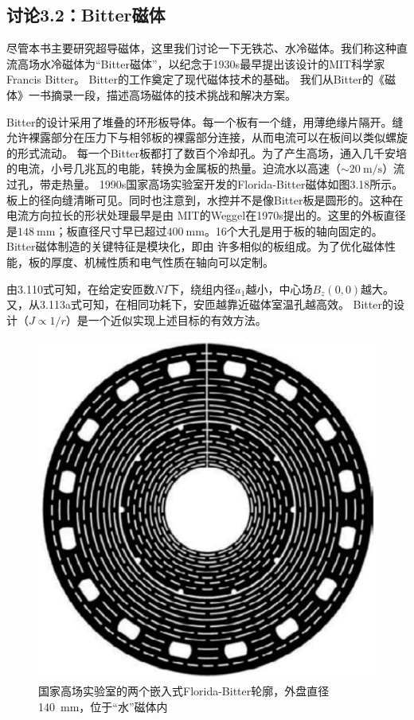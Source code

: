 \newpage
\subsection{讨论3.2：Bitter磁体}
尽管本书主要研究超导磁体，这里我们讨论一下无铁芯、水冷磁体。我们称这种直流高场水冷磁体为“Bitter磁体”，以纪念于1930s最早提出该设计的MIT科学家Francis Bitter。
Bitter的工作奠定了现代磁体技术的基础。
我们从Bitter的《磁体》一书摘录一段，描述高场磁体的技术挑战和解决方案。


Bitter的设计采用了堆叠的环形板导体。每一个板有一个缝，用薄绝缘片隔开。缝允许裸露部分在压力下与相邻板的裸露部分连接，从而电流可以在板间以类似螺旋的形式流动。
每一个Bitter板都打了数百个冷却孔。为了产生高场，通入几千安培的电流，小号几兆瓦的电能，转换为金属板的热量。迫流水以高速（$\sim 20\ \mathrm{m/s}$）流过孔，带走热量。
1990s国家高场实验室开发的Florida-Bitter磁体如图3.18所示。板上的径向缝清晰可见。同时也注意到，水控并不是像Bitter板是圆形的。这种在电流方向拉长的形状处理最早是由
MIT的Weggel在1970s提出的。这里的外板直径是$148\ \mathrm{mm}$；板直径尺寸早已超过$400\ \mathrm{mm}$。16个大孔是用于板的轴向固定的。Bitter磁体制造的关键特征是模块化，即由
许多相似的板组成。为了优化磁体性能，板的厚度、机械性质和电气性质在轴向可以定制。

由3.110式可知，在给定安匝数$NI$下，绕组内径$a_1$越小，中心场$B_z(0,0)$越大。又，从3.113a式可知，在相同功耗下，安匝越靠近磁体室温孔越高效。
Bitter的设计（$J\propto 1/r$）是一个近似实现上述目标的有效方法。

\begin{figure}[htbp]
  \centering
 \includegraphics[scale=0.5]{chpt3/figs/fig3.18.eps}
  \caption{国家高场实验室的两个嵌入式Florida-Bitter轮廓，外盘直径140\ mm，位于“水”磁体内}
\end{figure}

